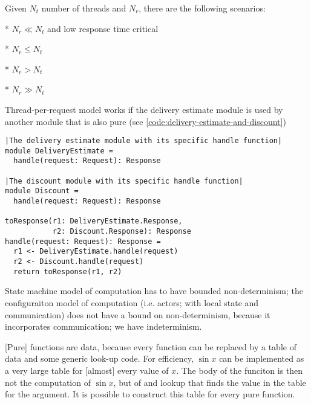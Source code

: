 Given $N_{t}$ number of threads and $N_{r}$, there are the following scenarios:

* $N_{r} \ll N_{t}$ and low response time critical

* $N_{r} \le N_{t}$ 

* $N_{r} > N_{t}$

* $N_{r} \gg N_{t}$

Thread-per-request model works if the delivery estimate module is used by another module that is also pure (see \autoref{code:delivery-estimate-and-discount})

\begin{lstlisting}[caption={Delivery and discount}, label={code:delivery-estimate-and-discount}, language=Pseudo, escapechar=|]
|The delivery estimate module with its specific handle function|
module DeliveryEstimate =
  handle(request: Request): Response

|The discount module with its specific handle function|
module Discount =
  handle(request: Request): Response

toResponse(r1: DeliveryEstimate.Response,
           r2: Discount.Response): Response
handle(request: Request): Response = 
  r1 <- DeliveryEstimate.handle(request)
  r2 <- Discount.handle(request)
  return toResponse(r1, r2)

\end{lstlisting}


State machine model of computation has to have bounded non-determinism; the configuraiton model of computation (i.e. actors; with local state and communication) does not have a bound on non-determinism, because it incorporates communication; we have indeterminism.

[Pure] functions are data, because every function can be replaced by a table of data and some generic look-up code. For efficiency, $\sin x$ can be implemented as a very large table for [almost] every value of $x$. The body of the funciton is then not the computation of $\sin x$, but of  and lookup that finds the value in the table for the argument. It is possible to construct this table for every pure function.


